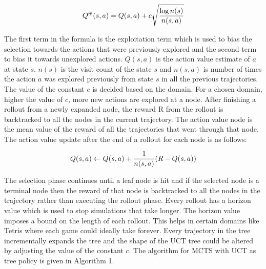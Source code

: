 \documentclass[double,12pt]{beavtex}
\begin{document}
\begin{equation}
\centering
Q^\oplus{(s,a)} = Q{(s, a)} + c \sqrt{\frac{\log n(s)}{n{(s,a)}}}
\end{equation}

The first term in the formula is the exploitation term which is used to bias the selection towards the actions that were previously explored and the second term to bias it towards unexplored actions. $Q(s,a)$ is the action value estimate of $a$ at state $s$. $n(s)$ is the visit count of the state $s$ and $n(s,a)$ is number of times the action $a$ was explored previously from state $s$ in all the previous trajectories. The value of the constant $c$ is decided based on the domain. For a chosen domain, higher the value of $c$, more new actions are explored at a node. After finishing a rollout from a newly expanded node, the reward R from the rollout is backtracked to all the nodes in the current trajectory. The action value node is the mean value of the reward of all the trajectories that went through that node. The action value update after the end of a rollout for each node is as follows:

\begin{equation}
\centering
Q(s,a) \leftarrow Q(s,a) + \frac{1}{n(s,a)} (R - Q(s,a))
\end{equation}

The selection phase continues until a leaf node is hit and if the selected node is a terminal node then the reward of that node is backtracked to all the nodes in the trajectory rather than executing the rollout phase. Every rollout has a horizon value which is used to stop simulations that take longer. The horizon value imposes a bound on the length of each rollout. This helps in certain domains like Tetris where each game could ideally take forever. Every trajectory in the tree incrementally expands the tree and the shape of the UCT tree could be altered by adjusting the value of the constant $c$. The algorithm for MCTS with UCT as tree policy is given in Algorithm 1.
\end{document}
